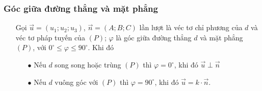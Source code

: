 \subsubsection{Góc giữa đường thẳng và mặt phẳng}
\begin{itemize}
	\item [\iconMT]   Gọi $\vec{u}=(u_1;u_2;u_3)$, $\vec{n}=(A;B;C)$ lần lượt là véc tơ chỉ phương của  $d$ và véc tơ pháp tuyến của $(P)$; $\varphi$ là góc giữa đường thẳng $d$ và mặt phẳng $(P)$, với $0^\circ \leq \varphi \leq 90^\circ$.
	Khi đó
	\item [\iconMT] 
	\begin{itemize}
		\item [$\bullet$] Nếu $d$ song song hoặc trùng $(P)$ thì $\varphi =0^\circ$, khi đó $\vec{u} \perp \vec{n}$
		\item [$\bullet$] Nếu $d$ vuông góc với $(P)$ thì $\varphi =90^\circ$, khi đó $\vec{u} =k \cdot \vec{n}$.
	\end{itemize}
\end{itemize}